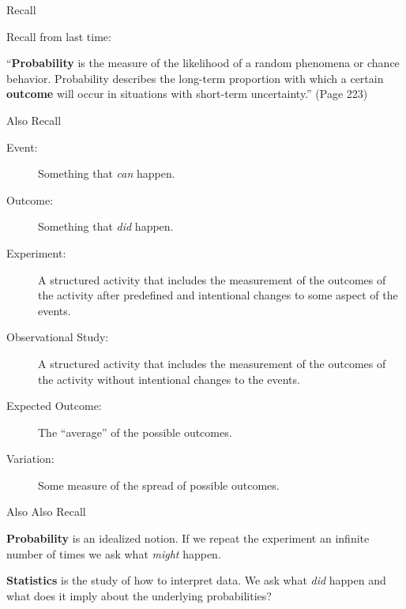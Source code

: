 \begin{frame}{Recall}

  Recall from last time:

  \begin{definition}[Probability]
    ``\textbf{Probability} is the measure of the likelihood of a random
    phenomena or chance behavior. Probability describes the long-term
    proportion with which a certain \textbf{outcome} will occur in
    situations with short-term uncertainty.'' (Page 223)
  \end{definition}

  
\end{frame}


\begin{frame}{Also Recall}

  \begin{description}
  \item[Event:] Something that \textit{\color{red}can} happen.
  \item[Outcome:] Something that \textit{\color{red}did} happen.
  \item[Experiment:] A structured activity that includes the
    measurement of the outcomes of the activity after predefined and
    {\color{blue}intentional changes to some aspect of the events}.
  \item[Observational Study:] A structured activity that includes the
    measurement of the outcomes of the activity {\color{blue}without
      intentional changes to the events}.
  \item[Expected Outcome:] The ``average'' of the possible outcomes.
  \item[{\color{red}Variation}:] {\color{red}Some measure of the
      spread of possible outcomes.}
  \end{description}
  
\end{frame}

\begin{frame}{Also Also Recall}

  \textbf{\color{blue}Probability} is an idealized notion. If we
    repeat the experiment an infinite number of times we ask what
    \textit{\color{red}might} happen.

  \vfill

  \textbf{\color{blue}Statistics} is the study of how to interpret
  data. We ask what \textit{\color{red}did} happen and what does it
  imply about the underlying probabilities?

  \vfill

\end{frame}


